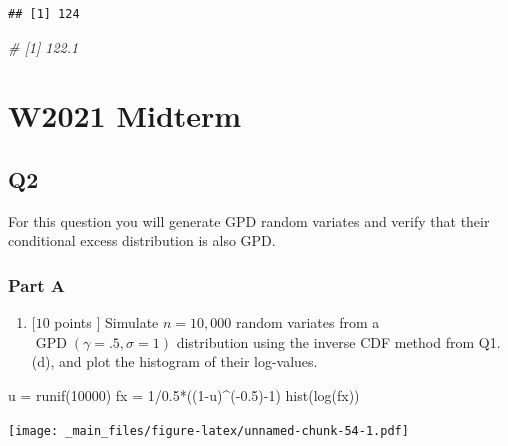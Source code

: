 \documentclass[
  oneside]{book}
\newenvironment{Shaded}{\begin{snugshade}}{\end{snugshade}}
\newcommand{\CommentTok}[1]{\textcolor[rgb]{0.56,0.35,0.01}{\textit{#1}}}
\newcommand{\DecValTok}[1]{\textcolor[rgb]{0.00,0.00,0.81}{#1}}
\newcommand{\FloatTok}[1]{\textcolor[rgb]{0.00,0.00,0.81}{#1}}
\newcommand{\FunctionTok}[1]{\textcolor[rgb]{0.00,0.00,0.00}{#1}}
\newcommand{\NormalTok}[1]{#1}
\newcommand{\OtherTok}[1]{\textcolor[rgb]{0.56,0.35,0.01}{#1}}
\newcommand{\SpecialCharTok}[1]{\textcolor[rgb]{0.00,0.00,0.00}{#1}}
\providecommand{\tightlist}{%
  \setlength{\itemsep}{0pt}\setlength{\parskip}{0pt}}
\begin{document}
\begin{verbatim}
## [1] 124
\end{verbatim}

\begin{Shaded}
\begin{Highlighting}[]
\CommentTok{\# [1] 122.1}
\end{Highlighting}
\end{Shaded}

\hypertarget{w2021-midterm}{%
\chapter{W2021 Midterm}\label{w2021-midterm}}

\hypertarget{q2-5}{%
\section{Q2}\label{q2-5}}

For this question you will generate GPD random variates and verify that their conditional excess distribution is also GPD.

\hypertarget{part-a-14}{%
\subsection{Part A}\label{part-a-14}}

\begin{enumerate}
\def\labelenumi{(\alph{enumi})}
\tightlist
\item
  \([10\) points \(]\) Simulate \(n=10,000\) random variates from a \(\operatorname{GPD}(\gamma=.5, \sigma=1)\) distribution using the inverse CDF method from Q1.(d), and plot the histogram of their log-values.
\end{enumerate}

\begin{Shaded}
\begin{Highlighting}[]
\NormalTok{u }\OtherTok{=} \FunctionTok{runif}\NormalTok{(}\DecValTok{10000}\NormalTok{)}
\NormalTok{fx }\OtherTok{=} \DecValTok{1}\SpecialCharTok{/}\FloatTok{0.5}\SpecialCharTok{*}\NormalTok{((}\DecValTok{1}\SpecialCharTok{{-}}\NormalTok{u)}\SpecialCharTok{\^{}}\NormalTok{(}\SpecialCharTok{{-}}\FloatTok{0.5}\NormalTok{)}\SpecialCharTok{{-}}\DecValTok{1}\NormalTok{)}
\FunctionTok{hist}\NormalTok{(}\FunctionTok{log}\NormalTok{(fx))}
\end{Highlighting}
\end{Shaded}

\texttt{[image: \_main\_files/figure-latex/unnamed-chunk-54-1.pdf]}
\end{document}
